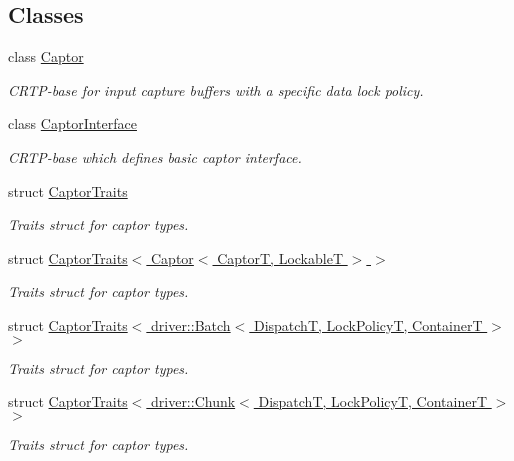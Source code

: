 \subsection*{Classes}
\begin{DoxyCompactItemize}
\item 
class \hyperlink{classflow_1_1_captor}{Captor}
\begin{DoxyCompactList}\small\item\em C\+R\+T\+P-\/base for input capture buffers with a specific data lock policy. \end{DoxyCompactList}\item 
class \hyperlink{classflow_1_1_captor_interface}{Captor\+Interface}
\begin{DoxyCompactList}\small\item\em C\+R\+T\+P-\/base which defines basic captor interface. \end{DoxyCompactList}\item 
struct \hyperlink{structflow_1_1_captor_traits}{Captor\+Traits}
\begin{DoxyCompactList}\small\item\em Traits struct for captor types. \end{DoxyCompactList}\item 
struct \hyperlink{structflow_1_1_captor_traits_3_01_captor_3_01_captor_t_00_01_lockable_t_01_4_01_4}{Captor\+Traits$<$ Captor$<$ Captor\+T, Lockable\+T $>$ $>$}
\begin{DoxyCompactList}\small\item\em Traits struct for captor types. \end{DoxyCompactList}\item 
struct \hyperlink{structflow_1_1_captor_traits_3_01driver_1_1_batch_3_01_dispatch_t_00_01_lock_policy_t_00_01_container_t_01_4_01_4}{Captor\+Traits$<$ driver\+::\+Batch$<$ Dispatch\+T, Lock\+Policy\+T, Container\+T $>$ $>$}
\begin{DoxyCompactList}\small\item\em Traits struct for captor types. \end{DoxyCompactList}\item 
struct \hyperlink{structflow_1_1_captor_traits_3_01driver_1_1_chunk_3_01_dispatch_t_00_01_lock_policy_t_00_01_container_t_01_4_01_4}{Captor\+Traits$<$ driver\+::\+Chunk$<$ Dispatch\+T, Lock\+Policy\+T, Container\+T $>$ $>$}
\begin{DoxyCompactList}\small\item\em Traits struct for captor types. \end{DoxyCompactList}\item 

\end{DoxyCompactItemize}
